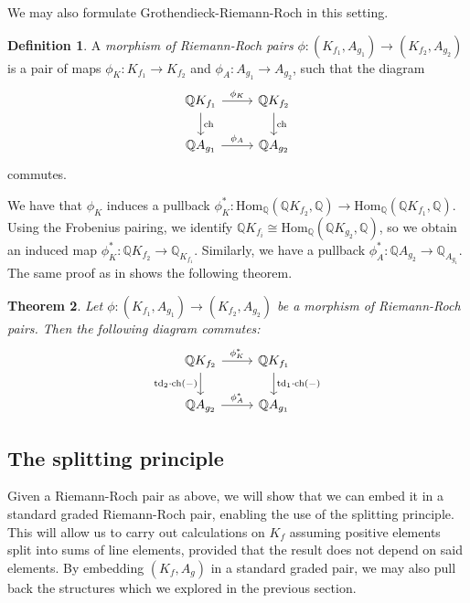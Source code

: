 \documentclass[oneside]{amsart}
\theoremstyle{plain}
\newtheorem{theorem}{Theorem}[section]
\theoremstyle{definition}
\newtheorem{definition}[theorem]{Definition}
\newcommand{\Q}{{\mathbb{Q}}}
\newcommand{\Hom}{{\mathrm{Hom}}}
\newcommand{\ch}{{\mathrm{ch}}}
\newcommand{\td}{{\mathrm{td}}}
\begin{document}
We may also formulate Grothendieck-Riemann-Roch in this setting.

\begin{definition}
    A \emph{morphism of Riemann-Roch pairs} $\phi: (K_{f_1}, A_{g_1}) \to (K_{f_2}, A_{g_2})$
    is a pair of maps $\phi_K: K_{f_1} \to K_{f_2}$
    and $\phi_A: A_{g_1} \to A_{g_2}$,
    such that the diagram
    \[
        \begin{tikzcd}
            \Q K_{f_1} \arrow[d, "\ch"] \arrow[r, "\phi_K"] & \Q K_{f_2} \arrow[d, "\ch"] \\
            \Q A_{g_1} \arrow[r, "\phi_A"]                  & \Q A_{g_2}                 
        \end{tikzcd}
    \]
    commutes.
\end{definition}

We have that $\phi_K$ induces a pullback $\phi_K^*: \Hom_\Q(\Q K_{f_2}, \Q) \to \Hom_\Q(\Q K_{f_1}, \Q)$. Using the Frobenius pairing, we identify $\Q K_{f_i} \cong \Hom_\Q(\Q K_{g_2}, \Q)$, so we obtain an induced map $\phi_K^*: \Q K_{f_2} \to \Q_{K_{f_1}}$. Similarly, we have a pullback $\phi_A^*: \Q A_{g_2} \to \Q_{A_{g_1}}$.
The same proof as in  shows the following theorem.

\begin{theorem}
    Let $\phi: (K_{f_1}, A_{g_1}) \to (K_{f_2}, A_{g_2})$ be a morphism of Riemann-Roch pairs. Then the following diagram commutes:
\[
\begin{tikzcd}
\Q K_{f_2} \arrow[d, "\td_2\cdot \ch(-)"'] \arrow[r, "\phi_K^*"] & \Q K_{f_1} \arrow[d, "\td_1\cdot\ch(-)"] \\
\Q A_{g_2} \arrow[r, "\phi_A^*"]                          & \Q A_{g_1}                         
\end{tikzcd}
\]
\end{theorem}

\subsection{The splitting principle}

Given a Riemann-Roch pair as above, we will show that we can embed it in a standard graded Riemann-Roch pair, enabling the use of the splitting principle.
This will allow us to carry out calculations on $K_f$ assuming positive elements split into sums of line elements, provided that the result does not depend on said elements.
By embedding $(K_f, A_g)$ in a standard graded pair, we may also pull back the structures which we explored in the previous section.
\end{document}
